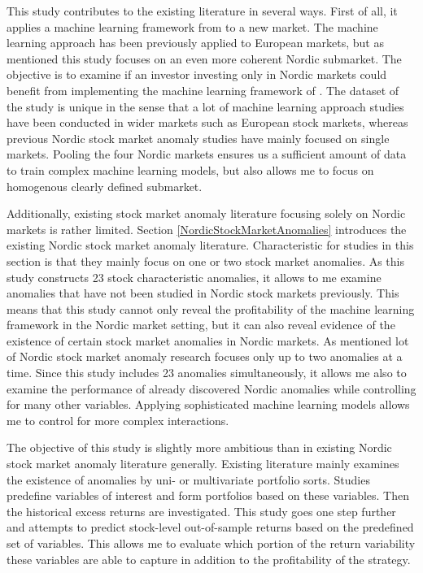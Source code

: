 \documentclass[12pt]{article}
\begin{document}
This study contributes to the existing literature in several ways. First of all, it applies a machine learning framework from \citet{guetal} to a new market.\footnotemark {} The machine learning approach has been previously applied to European markets, but as mentioned this study focuses on an even more coherent Nordic submarket.\footnotemark {} The objective is to examine if an investor investing only in Nordic markets could benefit from implementing the machine learning framework of \citet{guetal}. The dataset of the study is unique in the sense that a lot of machine learning approach studies have been conducted in wider markets such as European stock markets, whereas previous Nordic stock market anomaly studies have mainly focused on single markets. Pooling the four Nordic markets ensures us a sufficient amount of data to train complex machine learning models, but also allows me to focus on homogenous clearly defined submarket. \par

Additionally, existing stock market anomaly literature focusing solely on Nordic markets is rather limited. Section \ref{NordicStockMarketAnomalies} introduces the existing Nordic stock market anomaly literature. Characteristic for studies in this section is that they mainly focus on one or two stock market anomalies. As this study constructs 23 stock characteristic anomalies, it allows to me examine anomalies that have not been studied in Nordic stock markets previously. This means that this study cannot only reveal the profitability of the machine learning framework in the Nordic market setting, but it can also reveal evidence of the existence of certain stock market anomalies in Nordic markets. As mentioned lot of Nordic stock market anomaly research focuses only up to two anomalies at a time. Since this study includes 23 anomalies simultaneously, it allows me also to examine the performance of already discovered Nordic anomalies while controlling for many other variables. Applying sophisticated machine learning models allows me to control for more complex interactions. \par

The objective of this study is slightly more ambitious than in existing Nordic stock market anomaly literature generally. Existing literature mainly examines the existence of anomalies by uni- or multivariate portfolio sorts. Studies predefine variables of interest and form portfolios based on these variables. Then the historical excess returns are investigated. This study goes one step further and attempts to predict stock-level out-of-sample returns based on the predefined set of variables. This allows me to evaluate which portion of the return variability these variables are able to capture in addition to the profitability of the strategy. \par
\end{document}
